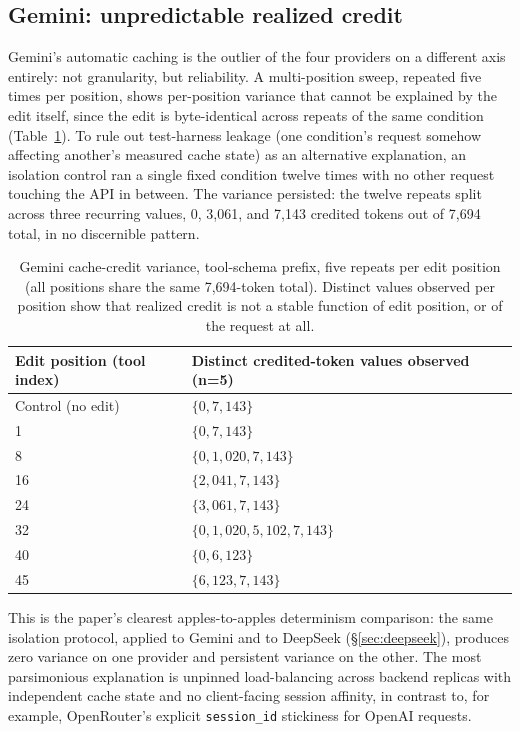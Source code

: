 \documentclass[11pt]{article}
\newcommand{\code}[1]{\texttt{#1}}
\begin{document}
\subsection{Gemini: unpredictable realized credit}
\label{sec:gemini}
Gemini's automatic caching is the outlier of the four providers on a
different axis entirely: not granularity, but reliability. A multi-position
sweep, repeated five times per position, shows per-position variance that
cannot be explained by the edit itself, since the edit is byte-identical
across repeats of the same condition (Table~\ref{tab:gemini}). To rule out
test-harness leakage (one condition's request somehow affecting another's
measured cache state) as an alternative explanation, an isolation control
ran a single fixed condition twelve times with no other request touching
the API in between. The variance persisted: the twelve repeats split across
three recurring values, 0, 3{,}061, and 7{,}143 credited tokens out of
7{,}694 total, in no discernible pattern.

\begin{table}[t]
\centering
\caption{Gemini cache-credit variance, tool-schema prefix, five repeats per
edit position (all positions share the same 7,694-token total). Distinct
values observed per position show that realized credit is not a stable
function of edit position, or of the request at all.}
\label{tab:gemini}
\begin{tabular}{@{}lll@{}}
\toprule
Edit position (tool index) & Distinct credited-token values observed (n=5) \\
\midrule
Control (no edit) & $\{0, 7{,}143\}$ \\
1  & $\{0, 7{,}143\}$ \\
8  & $\{0, 1{,}020, 7{,}143\}$ \\
16 & $\{2{,}041, 7{,}143\}$ \\
24 & $\{3{,}061, 7{,}143\}$ \\
32 & $\{0, 1{,}020, 5{,}102, 7{,}143\}$ \\
40 & $\{0, 6{,}123\}$ \\
45 & $\{6{,}123, 7{,}143\}$ \\
\bottomrule
\end{tabular}
\end{table}

This is the paper's clearest apples-to-apples determinism comparison:
the same isolation protocol, applied to Gemini and to DeepSeek
(\S\ref{sec:deepseek}), produces zero variance on one provider and
persistent variance on the other. The most parsimonious explanation is
unpinned load-balancing across backend replicas with independent cache
state and no client-facing session affinity, in contrast to, for example,
OpenRouter's explicit \code{session\_id} stickiness for OpenAI requests.
\end{document}
